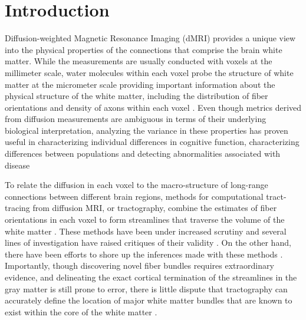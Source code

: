 \section*{Introduction}


Diffusion-weighted Magnetic Resonance Imaging (dMRI) provides a unique view into
the physical properties of the connections that comprise the brain white matter.
While the measurements are usually conducted with voxels at the millimeter
scale, water molecules within each voxel probe the structure of white matter at
the micrometer scale providing important information about the physical
structure of the white matter, including  the distribution of fiber orientations
and density of axons within each voxel \cite{wandell2016clarifying}. Even though
metrics derived from diffusion measurements are ambiguous in terms of their
underlying biological interpretation, analyzing the variance in these properties
has proven useful in characterizing individual differences in cognitive
function, characterizing differences between populations and detecting
abnormalities associated with disease \cite{Thomason2011-qn}

To relate the diffusion in each voxel to the macro-structure of long-range
connections between different brain regions, methods for computational
tract-tracing from diffusion MRI, or tractography, combine the estimates of
fiber orientations in each voxel to form streamlines that traverse the volume of
the white matter \cite{Conturo1999-je, Mori2002-qi}. These methods have been
under increased scrutiny and several lines of investigation have raised
critiques of their validity \cite{Maier-Hein2017-vb, Thomas2014-ki}. On the
other hand, there have been efforts to shore up the inferences made with these
methods \cite{Pestilli2014NatMeth, Takemura2016-sh, Smith2013-nc, Smith2015-cx,
Smith2015-zt, Rheault2018-wk}. Importantly, though discovering novel fiber
bundles requires extraordinary evidence, and delineating the exact cortical
termination of the streamlines in the gray matter is still prone to error, there
is little dispute that tractography can accurately define the location of major
white matter bundles that are known to exist within the core of the white matter
\cite{Maier-Hein2017-vb}.

